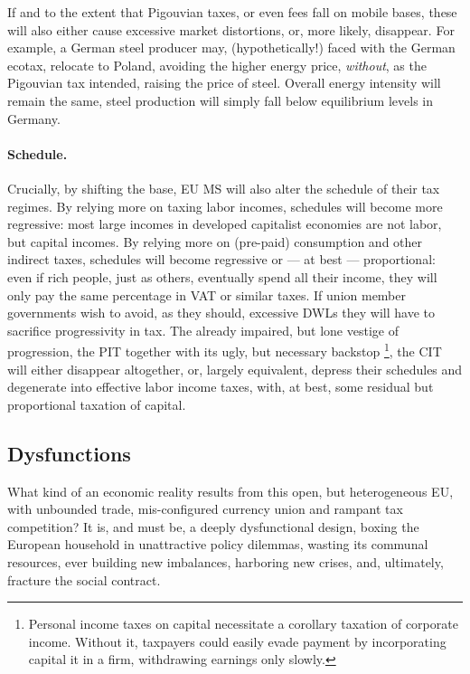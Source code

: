 \documentclass[11pt,a4paper,oneside,openright]{article}
\begin{document}
If and to the extent that Pigouvian taxes, or even fees fall on mobile bases, these will also either cause excessive market distortions, or, more likely, disappear. 
For example, a German steel producer may, (hypothetically!) faced with the German ecotax, relocate to Poland, avoiding the higher energy price, \emph{without}, as the Pigouvian tax intended, raising the price of steel. 
Overall energy intensity will remain the same, steel production will simply fall below equilibrium levels in Germany.

\paragraph{Schedule.} Crucially, by shifting the base, \gls{EU} \gls{MS} will also alter the schedule of their tax regimes. 
By relying more on taxing labor incomes, schedules will become more regressive: 
most large incomes in developed capitalist economies are not labor, but capital incomes. 
By relying more on (pre-paid) consumption and other indirect taxes, schedules will become regressive or --- at best --- proportional: 
even if rich people, just as others, eventually spend all their income, they will only pay the same percentage in \gls{VAT} or similar taxes. 
If union member governments wish to avoid, as they should, excessive \glspl{DWL} they will have to sacrifice progressivity in tax. 
The already impaired, but lone vestige of progression, the \gls{PIT} together with its ugly, but necessary backstop
\footnote{
	Personal income taxes on capital necessitate a corollary taxation of corporate income. 
	Without it, taxpayers could easily evade payment by incorporating capital it in a firm, withdrawing earnings only slowly.
}, 
the \gls{CIT} will either disappear altogether, or, largely equivalent, depress their schedules and degenerate into effective labor income taxes, with, at best, some residual but proportional taxation of capital.

\subsection{Dysfunctions} \label{sec:defunct} What kind of an economic reality results from this open, but heterogeneous \gls{EU}, with unbounded trade, mis-configured currency union and rampant tax competition? 
It is, and must be, a deeply dysfunctional design, boxing the European household in unattractive policy dilemmas, wasting its communal resources, ever building new imbalances, harboring new crises, and, ultimately, fracture the social contract.
\end{document}

